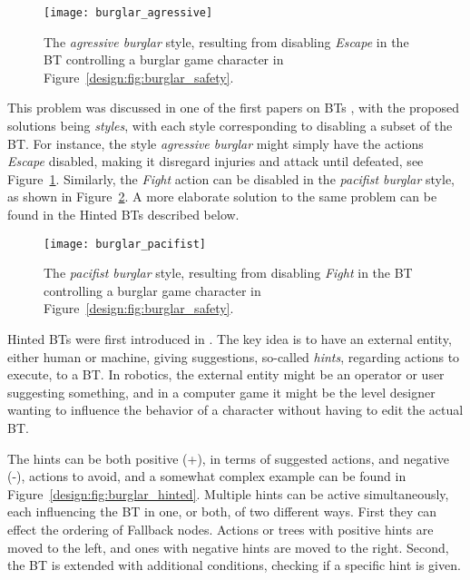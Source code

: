 \begin{figure}[h]
\centering
  \texttt{[image: burglar\_agressive]}
\caption{The \emph{agressive burglar} style, resulting from disabling  \emph{Escape} in the BT controlling a burglar game character in Figure~\ref{design:fig:burglar_safety}.}
\label{design:fig:burglar_agressive}
\end{figure}

This problem was discussed in one of the first papers on BTs \cite{isla2005handling}, 
with the proposed solutions being \emph{styles},
with each style corresponding to disabling a subset of the BT. For instance, the style \emph{agressive burglar}
might simply have the actions \emph{Escape} disabled, making it disregard injuries and attack until defeated, see Figure~\ref{design:fig:burglar_agressive}.
Similarly, the  \emph{Fight} action can be disabled in the \emph{pacifist burglar} style, as shown in Figure~\ref{design:fig:burglar_pacifist}.
A more elaborate solution to the same problem can be found in the Hinted BTs described below.

\begin{figure}[h]
\centering

  \texttt{[image: burglar\_pacifist]}
\caption{The \emph{pacifist burglar} style, resulting from disabling  \emph{Fight} in the BT controlling a burglar game character in Figure~\ref{design:fig:burglar_safety}.}
\label{design:fig:burglar_pacifist}
\end{figure}






Hinted BTs were first introduced in \cite{ocio2010dynamic, ocio2012adapting}.
The key idea is to have an external entity, either human or machine, 
giving suggestions, so-called \emph{hints}, regarding actions to execute, to a  BT.
In robotics, the external entity might be an operator or user suggesting something, and in a computer game
it might be the level designer wanting to influence the behavior of a character  without having to edit the actual BT.

The hints can be both positive (+), in terms of suggested actions, and negative (-), actions to avoid,
and a somewhat complex example can be found in Figure~\ref{design:fig:burglar_hinted}.
 Multiple hints can be active simultaneously,
 each influencing the BT in one, or both, of two different ways.
  First they can effect the ordering of Fallback nodes. Actions or trees with positive hints are moved to the left, and ones with negative hints are moved to the right.
 Second, the BT is extended with additional conditions, checking if a specific hint is given.


